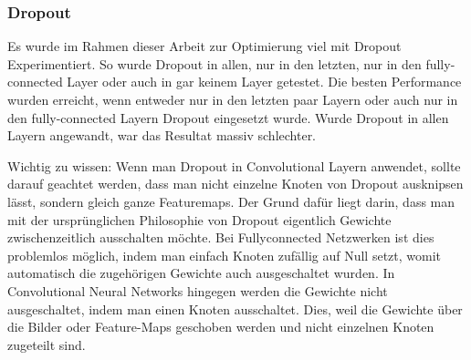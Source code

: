 \subsubsection{Dropout}
Es wurde im Rahmen dieser Arbeit zur Optimierung viel mit Dropout Experimentiert.
So wurde Dropout in allen, nur in den letzten, nur in den fully-connected Layer oder auch in gar keinem Layer getestet.
Die besten Performance wurden erreicht, wenn entweder nur in den letzten paar Layern oder auch nur in den fully-connected Layern Dropout eingesetzt wurde.
Wurde Dropout in allen Layern angewandt, war das Resultat massiv schlechter.

Wichtig zu wissen: Wenn man Dropout in Convolutional Layern anwendet, sollte darauf geachtet werden, dass man nicht einzelne Knoten von Dropout \grqq{}ausknipsen\grqq{} lässt, sondern gleich ganze Featuremaps.
Der Grund dafür liegt darin, dass man mit der ursprünglichen Philosophie von Dropout eigentlich Gewichte zwischenzeitlich ausschalten möchte.
Bei Fullyconnected Netzwerken ist dies problemlos möglich, indem man einfach Knoten zufällig auf Null setzt, womit automatisch die zugehörigen Gewichte auch ausgeschaltet wurden. 
In Convolutional Neural Networks hingegen werden die Gewichte nicht ausgeschaltet, indem man einen Knoten ausschaltet.
Dies, weil die Gewichte über die Bilder oder Feature-Maps geschoben werden und nicht einzelnen Knoten zugeteilt sind.


